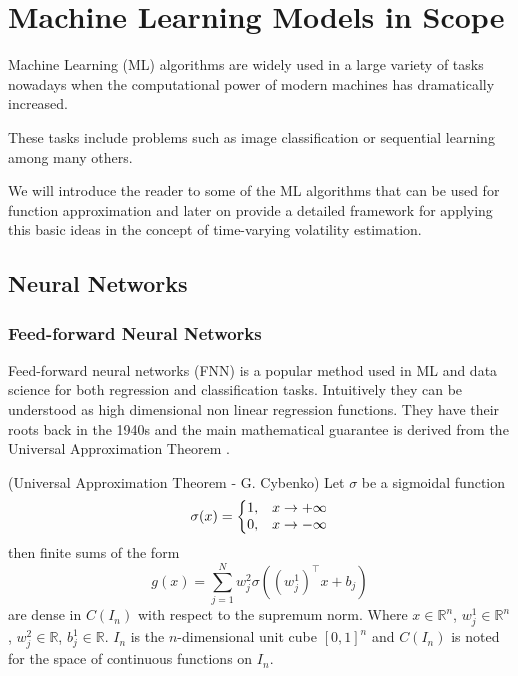 \documentclass[a4paper, oneside]{discothesis}
\begin{document}
\chapter{Machine Learning Models in Scope}

Machine Learning (ML) algorithms are widely used in a large variety of tasks nowadays when the computational power of modern machines has dramatically increased. 

These tasks include problems such as image classification \cite{imageNet} or sequential learning  \cite{https://doi.org/10.48550/arxiv.1706.03762} among many others.

We will introduce the reader to some of the ML algorithms that can be used for function approximation and later on provide a detailed framework for applying this basic ideas in the concept of time-varying volatility estimation.  

\section{Neural Networks}
\subsection{Feed-forward Neural Networks}\label{FNN}

Feed-forward neural networks (FNN) is a popular method used in ML and data science for both regression and classification tasks. Intuitively they can be understood as high dimensional non linear regression functions. They have their roots back in the 1940s and the main mathematical guarantee is derived from the Universal Approximation Theorem \cite{Cybenko1989ApproximationBS}. 

\theorem (Universal Approximation Theorem - G. Cybenko) Let $\sigma$ be a sigmoidal function 
\begin{equation}
\sigma(x) = \left\{ \begin{array}{@{}ll@{}}
    1, &  x\rightarrow+\infty  \\
    0, & x\rightarrow-\infty
\end{array}\right.
\end{equation}
then finite sums of the form 
\begin{equation}
g(x) = \sum_{j=1}^{N} w_j^2\sigma((w^1_j)^\intercal x+b_j)
\end{equation}
are dense in $C(I_n)$ with respect to the supremum norm. Where $x\in \mathbb{R}^n$, $w_j^1\in  \mathbb{R}^n$, $w_j^2\in \mathbb{R}$, $b_j^1\in \mathbb{R}$. $I_n$ is the $n$-dimensional unit cube $[0,1]^n$ and $C(I_n)$ is noted for the space of continuous functions on $I_n$.
\end{document}
